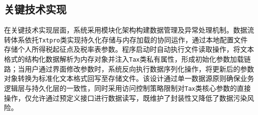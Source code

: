 \documentclass[a4paper, utf8]{ctexart}
\begin{document}
    \subsection{关键技术实现}

    在关键技术实现层面，系统采用模块化架构构建数据管理及异常处理机制。数据流转体系依托\verb|Txtpro|类实现持久化存储与内存加载的协同运作，通过本地配置文件存储个人所得税起征点及税率表参数。程序启动时自动执行文件读取操作，将文本格式的结构化数据解析为内存对象并注入\verb|Tax|类私有属性，形成初始化参数加载链路；当用户通过界面修改参数时，系统反向执行数据序列化操作，将更新后的参数对象转换为标准化文本格式回写至存储文件。该设计通过单一数据源原则确保业务逻辑层与持久化层的一致性，同时采用访问控制策略限制对\verb|Tax|类核心参数的直接操作，仅允许通过预定义接口进行数据读写，既维护了封装性又降低了数据污染风险。
\end{document}
